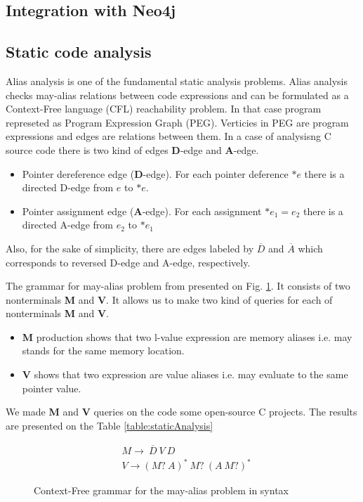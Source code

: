 \subsection{Integration with Neo4j}

\subsection{Static code analysis}

Alias analysis is one of the fundamental static analysis problems\cite{Marlowe}. Alias analysis checks may-alias relations between code expressions and can be formulated as a Context-Free language (CFL) reachability problem\cite{Reps}. In that case program represeted as Program Expression Graph (PEG)\cite{Zheng}. Verticies in PEG are program expressions and edges are relations between them. In a case of analysisng C source code there is two kind of edges \textbf{D}-edge and \textbf{A}-edge.
\begin{itemize}
	\item Pointer dereference edge (\textbf{D}-edge). For each pointer deference $*e$ there is a directed D-edge from $e$ to $*e$.
	\item Pointer assignment edge (\textbf{A}-edge). For each assignment $*e_1=e_2$ there is a directed A-edge from $e_2$ to $*e_1$
\end{itemize}
Also, for the sake of simplicity, there are edges labeled by $\overline{D}$ and $\overline{A}$ which corresponds to reversed D-edge and A-edge, respectively.

The grammar for may-alias problem from \cite{Zheng} presented on Fig. \ref{lst:aliasGrammar}. It consists of two nonterminals \textbf{M} and \textbf{V}. It allows us to make two kind of queries for each of nonterminals \textbf{M} and \textbf{V}.
\begin{itemize}
	\item \textbf{M} production shows that two l-value expression are memory aliases i.e. may stands for the same memory location.
	\item \textbf{V} shows that two expression are value aliases i.e. may evaluate to the same pointer value.
\end{itemize}

We made \textbf{M} and \textbf{V} queries on the code some open-source C projects. The results are presented on the Table \ref{table:staticAnalysis} 

\begin{figure}[t]
\begin{align*}
& M \rightarrow\ \overline{D}\ V\ D\\
& V \rightarrow (M ?\ A)^{*} \ M?\ (A\ M?)^{*}
\end{align*}
\caption{Context-Free grammar for the may-alias problem in syntax}
\label{lst:aliasGrammar}
\end{figure}



